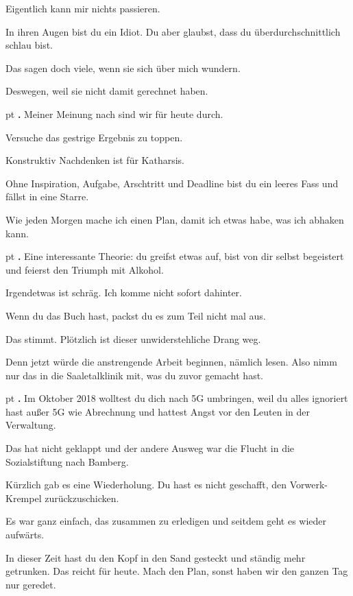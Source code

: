 \documentclass[10pt,a4paper]{article}
\newcounter{notec}
\newcommand\notep[1]{%
  \stepcounter{notec}
  \vskip #1pt
  {\bf\arabic{notec}.}
}
\begin{document}
\begin{mdframed}[style=daystyle]
  \vskip 2pt
  Eigentlich kann mir nichts passieren.

  \vskip 2pt
  In ihren Augen bist du ein Idiot. Du aber glaubst, dass du
  überdurchschnittlich schlau bist.

  \vskip 2pt
  Das sagen doch viele, wenn sie sich über mich wundern.

  \vskip 2pt
  Deswegen, weil sie nicht damit gerechnet haben.

  
  \notep 4 Meiner Meinung nach sind wir für heute durch.

  \vskip 2pt
  Versuche das gestrige Ergebnis zu toppen.

  \vskip 2pt
  Konstruktiv Nachdenken ist für Katharsis.

  \vskip 2pt
  Ohne Inspiration, Aufgabe, Arschtritt und Deadline bist du ein leeres Fass und
  fällst in eine Starre.

  \vskip 2pt
  Wie jeden Morgen mache ich einen Plan, damit ich etwas habe, was ich abhaken
  kann.


  \notep 4 Eine interessante Theorie: du greifst etwas auf, bist von dir selbst
  begeistert und feierst den Triumph mit Alkohol.

  \vskip 2pt
  Irgendetwas ist schräg. Ich komme nicht sofort dahinter.

  \vskip 2pt
  Wenn du das Buch hast, packst du es zum Teil nicht mal aus.

  \vskip 2pt
  Das stimmt. Plötzlich ist dieser unwiderstehliche Drang weg.

  \vskip 2pt
  Denn jetzt würde die anstrengende Arbeit beginnen, nämlich lesen. Also nimm
  nur das in die Saaletalklinik mit, was du zuvor gemacht hast.


  \notep 4 Im Oktober 2018 wolltest du dich nach 5G umbringen, weil du alles
  ignoriert hast außer 5G wie Abrechnung und hattest Angst vor den Leuten in der
  Verwaltung.

  \vskip 2pt
  Das hat nicht geklappt und der andere Ausweg war die Flucht in die
  Sozialstiftung nach Bamberg.

  \vskip 2pt
  Kürzlich gab es eine Wiederholung. Du hast es nicht geschafft, den
  Vorwerk-Krempel zurückzuschicken.

  \vskip 2pt
  Es war ganz einfach, das zusammen zu erledigen und seitdem geht es wieder
  aufwärts.

  \vskip 2pt
  In dieser Zeit hast du den Kopf in den Sand gesteckt und ständig mehr
  getrunken. Das reicht für heute. Mach den Plan, sonst haben wir den ganzen Tag
  nur geredet.

\end{mdframed}
\end{document}
